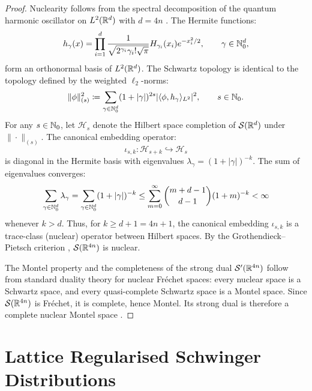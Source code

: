 \begin{proof}
Nuclearity follows from the spectral decomposition of the quantum harmonic oscillator on $L^2(\mathbb{R}^d)$ with $d = 4n$ \cite{Grothendieck1955, Treves1967}. The Hermite functions:
\begin{equation}
h_\gamma(x) = \prod_{i=1}^d \frac{1}{\sqrt{2^{\gamma_i} \gamma_i! \sqrt{\pi}}} H_{\gamma_i}(x_i) e^{-x_i^2/2}, \qquad \gamma \in \mathbb{N}_0^d,
\end{equation}
form an orthonormal basis of $L^2(\mathbb{R}^d)$. The Schwartz topology is identical to the topology defined by the weighted $\ell_2$-norms:
\begin{equation}
\|\phi\|_{(s)}^2 \coloneqq \sum_{\gamma \in \mathbb{N}_0^d} (1 + |\gamma|)^{2s} |\langle \phi, h_\gamma \rangle_{L^2}|^2, \qquad s \in \mathbb{N}_0.
\end{equation}
For any $s \in \mathbb{N}_0$, let $\mathcal{H}_s$ denote the Hilbert space completion of $\mathcal{S}(\mathbb{R}^d)$ under $\|\cdot\|_{(s)}$. The canonical embedding operator:
\begin{equation}
\iota_{s, k} : \mathcal{H}_{s + k} \hookrightarrow \mathcal{H}_s
\end{equation}
is diagonal in the Hermite basis with eigenvalues $\lambda_\gamma = (1 + |\gamma|)^{-k}$. The sum of eigenvalues converges:
\begin{equation}
\sum_{\gamma \in \mathbb{N}_0^d} \lambda_\gamma = \sum_{\gamma \in \mathbb{N}_0^d} (1 + |\gamma|)^{-k} \le \sum_{m=0}^\infty \binom{m + d - 1}{d - 1} (1 + m)^{-k} < \infty
\end{equation}
whenever $k > d$. Thus, for $k \ge d + 1 = 4n + 1$, the canonical embedding $\iota_{s, k}$ is a trace-class (nuclear) operator between Hilbert spaces. By the Grothendieck--Pietsch criterion \cite{GelfandVilenkin1964}, $\mathcal{S}(\mathbb{R}^{4n})$ is nuclear.

The Montel property and the completeness of the strong dual $\mathcal{S}'(\mathbb{R}^{4n})$ follow from standard duality theory for nuclear Fr\'echet spaces: every nuclear space is a Schwartz space, and every quasi-complete Schwartz space is a Montel space. Since $\mathcal{S}(\mathbb{R}^{4n})$ is Fr\'echet, it is complete, hence Montel. Its strong dual is therefore a complete nuclear Montel space \cite{Treves1967}.
\end{proof}

\section{Lattice Regularised Schwinger Distributions}
\label{sec:lattice_schwinger_distrib}

